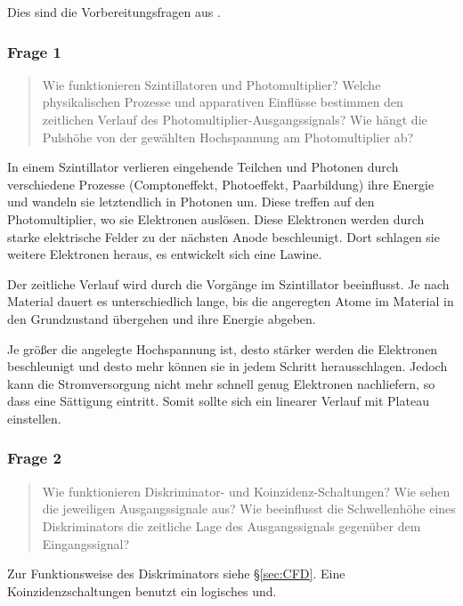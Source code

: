 \documentclass[11pt, ngerman, fleqn, DIV=15, headinclude, BCOR=2cm]{scrreprt}
\begin{document}
Dies sind die Vorbereitungsfragen aus \parencite[11]{physik512-Anleitung}.

\subsubsection{Frage 1}
\label{sec:frage1-1}

\begin{quote}
    Wie funktionieren Szintillatoren und Photomultiplier? Welche physikalischen
    Prozesse und apparativen Einflüsse bestimmen den zeitlichen Verlauf des
    Photomultiplier-Ausgangssignals? Wie hängt die Pulshöhe von der gewählten
    Hochspannung am Photomultiplier ab?
\end{quote}

In einem Szintillator verlieren eingehende Teilchen und Photonen durch
verschiedene Prozesse (Comptoneffekt, Photoeffekt, Paarbildung) ihre Energie
und wandeln sie letztendlich in Photonen um. Diese treffen auf den
Photomultiplier, wo sie Elektronen auslösen. Diese Elektronen werden durch
starke elektrische Felder zu der nächsten Anode beschleunigt. Dort schlagen sie
weitere Elektronen heraus, es entwickelt sich eine Lawine.

Der zeitliche Verlauf wird durch die Vorgänge im Szintillator beeinflusst. Je
nach Material dauert es unterschiedlich lange, bis die angeregten Atome im
Material in den Grundzustand übergehen und ihre Energie abgeben.


Je größer die angelegte Hochspannung ist, desto stärker werden die Elektronen
beschleunigt und desto mehr können sie in jedem Schritt herausschlagen. Jedoch
kann die Stromversorgung nicht mehr schnell genug Elektronen nachliefern, so
dass eine Sättigung eintritt. Somit sollte sich ein linearer Verlauf mit
Plateau einstellen.

\subsubsection{Frage 2}

\begin{quote}
    Wie funktionieren Diskriminator- und Koinzidenz-Schaltungen? Wie sehen die
    jeweiligen Ausgangssignale aus? Wie beeinflusst die Schwellenhöhe eines
    Diskriminators die zeitliche Lage des Ausgangssignals gegenüber dem
    Eingangssignal?
\end{quote}

Zur Funktionsweise des Diskriminators siehe §\ref{sec:CFD}. Eine
Koinzidenzschaltungen benutzt ein logisches und.
\end{document}
